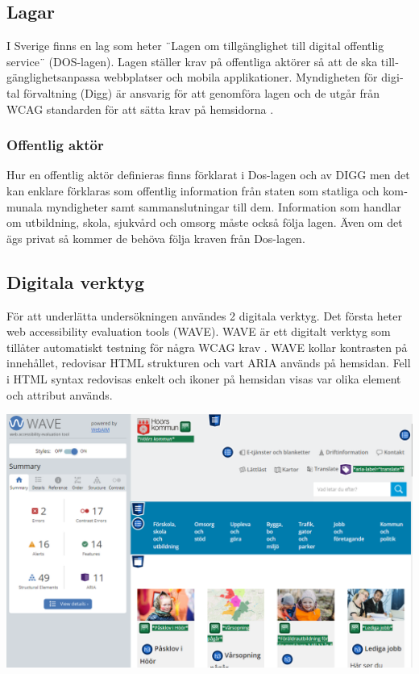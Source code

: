 \documentclass[11p]{article}
\begin{document}
\begin{otherlanguage}{swedish}
    \subsection{Lagar}
    I Sverige finns en lag som heter ¨Lagen om tillgänglighet till digital offentlig service¨ (DOS-lagen)\parencite{Dos-lagen}.
    Lagen ställer krav på offentliga aktörer så att de ska tillgänglighetsanpassa webbplatser och mobila applikationer.
    Myndigheten för digital förvaltning (Digg) är ansvarig för att genomföra lagen och de utgår från WCAG standarden för att sätta krav på hemsidorna \parencite{Utförande_av_Dos_lagen}.

    \subsubsection{Offentlig aktör}
    Hur en offentlig aktör definieras finns förklarat i Dos-lagen \parencite{Dos-lagen} och av DIGG \parencite{Om_Dos-lagen} men det kan enklare förklaras som offentlig information från staten som statliga och kommunala myndigheter samt sammanslutningar till dem.
    Information som handlar om utbildning, skola, sjukvård och omsorg måste också följa lagen.
    Även om det ägs privat så kommer de behöva följa kraven från Dos-lagen.

    \subsection{Digitala verktyg}
    För att underlätta undersökningen användes 2 digitala verktyg.
    Det första heter web accessibility evaluation tools (WAVE).
    WAVE är ett digitalt verktyg som tillåter automatiskt testning för några WCAG krav \parencite{WAVE}.
    WAVE kollar kontrasten på innehållet, redovisar HTML strukturen och vart ARIA används på hemsidan.
    Fell i HTML syntax redovisas enkelt och ikoner på hemsidan visas var olika element och attribut används.

    \begin{center}

    \includegraphics[width=1\textwidth]{../images/höörsKommunhemsida_WAVE.png}


\end{center}
\end{otherlanguage}
\end{document}

